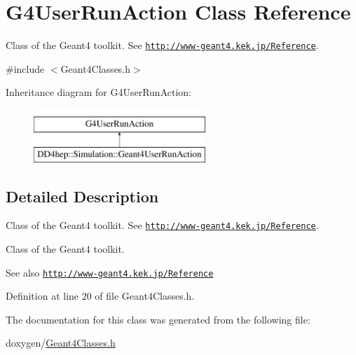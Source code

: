 \hypertarget{class_g4_user_run_action}{}\section{G4\+User\+Run\+Action Class Reference}
\label{class_g4_user_run_action}


Class of the Geant4 toolkit. See \href{http://www-geant4.kek.jp/Reference}{\tt http\+://www-\/geant4.\+kek.\+jp/\+Reference}.  




{\ttfamily \#include $<$Geant4\+Classes.\+h$>$}

Inheritance diagram for G4\+User\+Run\+Action\+:\begin{figure}[H]
\begin{center}
\leavevmode
\includegraphics[height=2.000000cm]{class_g4_user_run_action}
\end{center}
\end{figure}


\subsection{Detailed Description}
Class of the Geant4 toolkit. See \href{http://www-geant4.kek.jp/Reference}{\tt http\+://www-\/geant4.\+kek.\+jp/\+Reference}. 

Class of the Geant4 toolkit. \begin{DoxySeeAlso}{See also}
\href{http://www-geant4.kek.jp/Reference}{\tt http\+://www-\/geant4.\+kek.\+jp/\+Reference} 
\end{DoxySeeAlso}


Definition at line 20 of file Geant4\+Classes.\+h.



The documentation for this class was generated from the following file\+:\begin{DoxyCompactItemize}
\item 
doxygen/\hyperlink{_geant4_classes_8h}{Geant4\+Classes.\+h}\end{DoxyCompactItemize}
